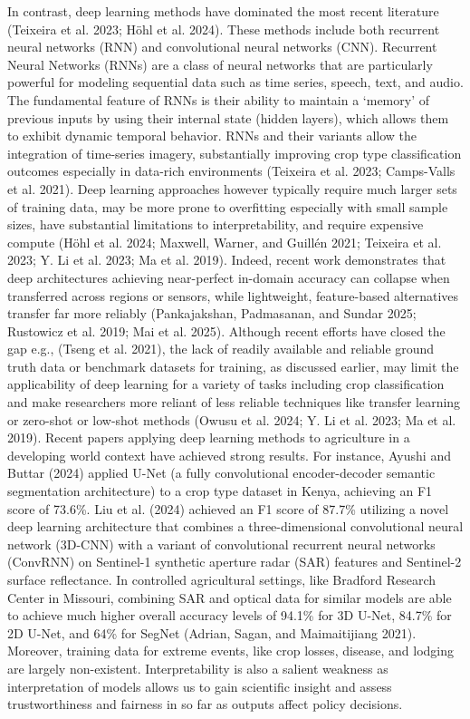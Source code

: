 \documentclass[
  journal,
  twocolumn]{IEEEtran}
\begin{document}
In contrast, deep learning methods have dominated the most recent
literature (Teixeira et al. 2023; Höhl et al. 2024). These methods
include both recurrent neural networks (RNN) and convolutional neural
networks (CNN). Recurrent Neural Networks (RNNs) are a class of neural
networks that are particularly powerful for modeling sequential data
such as time series, speech, text, and audio. The fundamental feature of
RNNs is their ability to maintain a `memory' of previous inputs by using
their internal state (hidden layers), which allows them to exhibit
dynamic temporal behavior. RNNs and their variants allow the integration
of time-series imagery, substantially improving crop type classification
outcomes especially in data-rich environments (Teixeira et al. 2023;
Camps-Valls et al. 2021). Deep learning approaches however typically
require much larger sets of training data, may be more prone to
overfitting especially with small sample sizes, have substantial
limitations to interpretability, and require expensive compute (Höhl et
al. 2024; Maxwell, Warner, and Guillén 2021; Teixeira et al. 2023; Y. Li
et al. 2023; Ma et al. 2019). Indeed, recent work demonstrates that deep
architectures achieving near-perfect in-domain accuracy can collapse
when transferred across regions or sensors, while lightweight,
feature-based alternatives transfer far more reliably (Pankajakshan,
Padmasanan, and Sundar 2025; Rustowicz et al. 2019; Mai et al. 2025).
Although recent efforts have closed the gap e.g., (Tseng et al. 2021),
the lack of readily available and reliable ground truth data or
benchmark datasets for training, as discussed earlier, may limit the
applicability of deep learning for a variety of tasks including crop
classification and make researchers more reliant of less reliable
techniques like transfer learning or zero-shot or low-shot methods
(Owusu et al. 2024; Y. Li et al. 2023; Ma et al. 2019). Recent papers
applying deep learning methods to agriculture in a developing world
context have achieved strong results. For instance, Ayushi and Buttar
(2024) applied U-Net (a fully convolutional encoder-decoder semantic
segmentation architecture) to a crop type dataset in Kenya, achieving an
F1 score of 73.6\%. Liu et al. (2024) achieved an F1 score of 87.7\%
utilizing a novel deep learning architecture that combines a
three-dimensional convolutional neural network (3D-CNN) with a variant
of convolutional recurrent neural networks (ConvRNN) on Sentinel-1
synthetic aperture radar (SAR) features and Sentinel-2 surface
reflectance. In controlled agricultural settings, like Bradford Research
Center in Missouri, combining SAR and optical data for similar models
are able to achieve much higher overall accuracy levels of 94.1\% for 3D
U-Net, 84.7\% for 2D U-Net, and 64\% for SegNet (Adrian, Sagan, and
Maimaitijiang 2021). Moreover, training data for extreme events, like
crop losses, disease, and lodging are largely non-existent.
Interpretability is also a salient weakness as interpretation of models
allows us to gain scientific insight and assess trustworthiness and
fairness in so far as outputs affect policy decisions.
\end{document}
